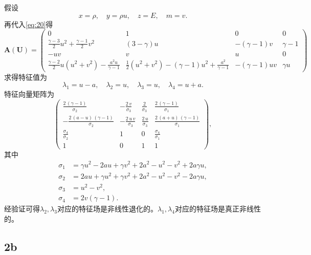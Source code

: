 \documentclass[12pt]{article}
\begin{document}
假设
\begin{equation}
	x=\rho,\quad y=\rho u, \quad z=E,\quad m=v.
	\label{eq:20}
\end{equation}
再代入\cref{eq:20}得
\begin{equation}
	\boldsymbol{A}(\boldsymbol{U})=\begin{pmatrix}
		0 & 1 & 0 &0\\
		\frac{\gamma-3}{2} u^{2} + \frac{\gamma-1}{2}v^2 & (3-\gamma) u & - {(\gamma-1)v}&\gamma-1 \\
		-uv&v&u&0\\
		\frac{\gamma-2}{2}u (u^{2}+v^2)-\frac{a^{2} u}{\gamma-1} & \frac{1}{2} (u^{2}+v^2)-(\gamma-1)u^2+\frac{a^{2}}{\gamma-1} &-(\gamma-1)uv &\gamma u
	\end{pmatrix}
\end{equation}
求得特征值为
\begin{equation}
	\lambda_1 = u-a,\quad\lambda_2 = u,\quad\lambda_3 = u,\quad\lambda_4 = u+a.
\end{equation}
特征向量矩阵为
\begin{equation}
	\begin{pmatrix}
		 \frac{2\,{\left(\gamma-1\right)}}{\sigma_2 }&-\frac{2\,v}{\sigma_3 } & \frac{2}{\sigma_3 } & \frac{2\,{\left(\gamma-1\right)}}{\sigma_1 } \\
		-\frac{2\,{\left(a-u\right)}\,{\left(\gamma-1\right)}}{\sigma_2 }& -\frac{2\,u\,v}{\sigma_3 } & \frac{2\,u}{\sigma_3 } & \frac{2\,{\left(a+u\right)}\,{\left(\gamma-1\right)}}{\sigma_1 } \\
		\frac{\sigma_4 }{\sigma_2 } &1 & 0 & \frac{\sigma_4 }{\sigma_1 } \\
		1&0 & 1 & 1 
	\end{pmatrix},
	\label{eq:21}
\end{equation}
其中
\begin{align}
	\sigma_1 &=\gamma u^2 -2au+\gamma v^2 +2a^2 -u^2 -v^2 +2a\gamma u,\\
	\sigma_2 &=2au+\gamma u^2 +\gamma v^2 +2a^2 -u^2 -v^2 -2a\gamma u,\\
	\sigma_3 &=u^2 -v^2, \\
	\sigma_4 &=2v{\left(\gamma-1\right)}.
\end{align}
经验证可得$\lambda_2,\lambda_3$对应的特征场是非线性退化的。$\lambda_1,\lambda_4$对应的特征场是真正非线性的。

\subsection{2b}
\end{document}
